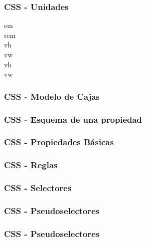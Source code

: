 \documentclass[a4paper,slidestop,xcolor=pst,blue]{beamer}
\begin{document}
\begin{frame}[c]
    \frametitle{CSS - Unidades}
    \begin{description}
        \item[em]
        \item[rem]
        \item[vh]
        \item[vw]
        \item[vh]
        \item[vw]
    \end{description}
\end{frame}

\begin{frame}[c]
    \frametitle{CSS - Modelo de Cajas}
\end{frame}

\begin{frame}[c]
    \frametitle{CSS - Esquema de una propiedad}
\end{frame}

\begin{frame}[c]
    \frametitle{CSS - Propiedades Básicas}
\end{frame}

\begin{frame}[c]
    \frametitle{CSS - Reglas}
\end{frame}


\begin{frame}[c]
    \frametitle{CSS - Selectores}
\end{frame}

\begin{frame}[c]
    \frametitle{CSS - Pseudoselectores}
\end{frame}

\begin{frame}[c]
    \frametitle{CSS - Pseudoselectores}
\end{frame}
\end{document}
